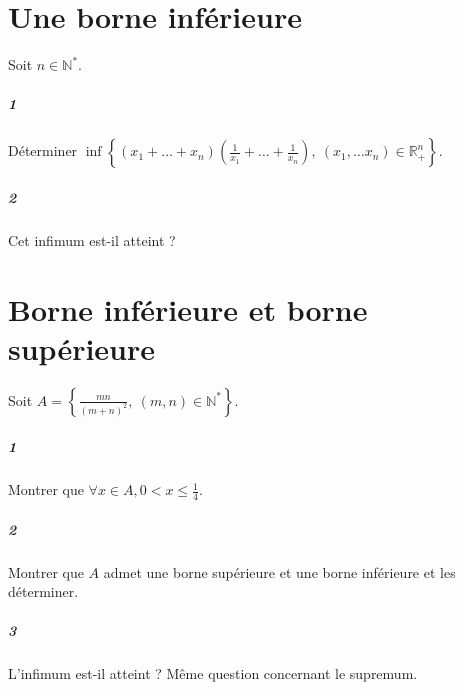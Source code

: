 \documentclass[10pt,a4paper]{article}
\begin{document}
\section{Une borne inférieure}
Soit $n \in \mathbb{N}^*$.
\subparagraph{1}Déterminer $\inf \left\lbrace \left( x_1+ \dots + x_n \right) \left( \frac{1}{x_1}+ \dots + \frac{1}{x_n} \right), \ (x_1, \dots x_n) \in \mathbb{R}_+^n\right\rbrace$.
\subparagraph{2}Cet infimum est-il atteint ?

\section{Borne inférieure et borne supérieure}
Soit $A= \left\lbrace \frac{mn}{(m+n)^2}, \ (m,n) \in \mathbb{N}^* \right\rbrace$.
\subparagraph{1}Montrer que $\forall x \in  A, 0<x \le \frac{1}{4}$.
\subparagraph{2}Montrer que $A$ admet une borne supérieure et une borne inférieure et les déterminer.
\subparagraph{3}L'infimum est-il atteint ? Même question concernant le supremum.
\end{document}
